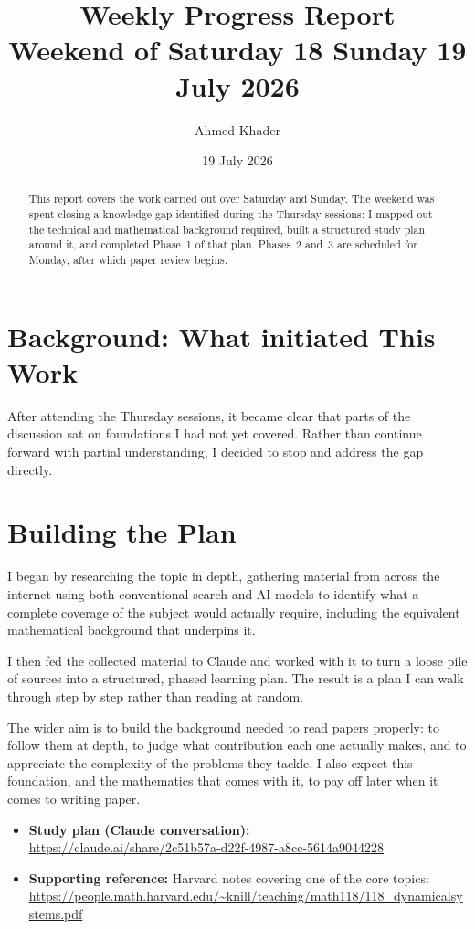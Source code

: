 \documentclass[11pt,a4paper]{article}
\title{\textbf{Weekly Progress Report}\\[0.3em]
\large Weekend of Saturday 18  Sunday 19 July 2026}
\author{Ahmed Khader}
\date{19 July 2026}
\begin{document}
\maketitle

\begin{abstract}
\noindent This report covers the work carried out over Saturday and Sunday.
The weekend was spent closing a knowledge gap identified during the Thursday
sessions: I mapped out the technical and mathematical background required,
built a structured study plan around it, and completed Phase~1 of that plan.
Phases~2 and~3 are scheduled for Monday, after which paper review begins.
\end{abstract}

\section{Background: What initiated This Work}

After attending the Thursday sessions, it became clear that parts of the
discussion sat on foundations I had not yet covered. Rather than continue
forward with partial understanding, I decided to stop and address the gap
directly.

\section{Building the Plan}

I began by researching the topic in depth, gathering material from across the
internet using both conventional search and AI models to identify what a
complete coverage of the subject would actually require, including the
equivalent mathematical background that underpins it.

I then fed the collected material to Claude and worked with it to turn a loose
pile of sources into a structured, phased learning plan. The result is a plan I
can walk through step by step rather than reading at random.

The wider aim is to build the background needed to read papers properly: to
follow them at depth, to judge what contribution each one actually makes, and
to appreciate the complexity of the problems they tackle. I also expect this
foundation, and the mathematics that comes with it, to pay off later when it
comes to writing paper.

\begin{itemize}
  \item \textbf{Study plan (Claude conversation):}\\
        \url{https://claude.ai/share/2c51b57a-d22f-4987-a8cc-5614a9044228}
  \item \textbf{Supporting reference:} Harvard notes covering one of the core
        topics:\\
        \url{https://people.math.harvard.edu/~knill/teaching/math118/118_dynamicalsystems.pdf}
\end{itemize}
\end{document}
